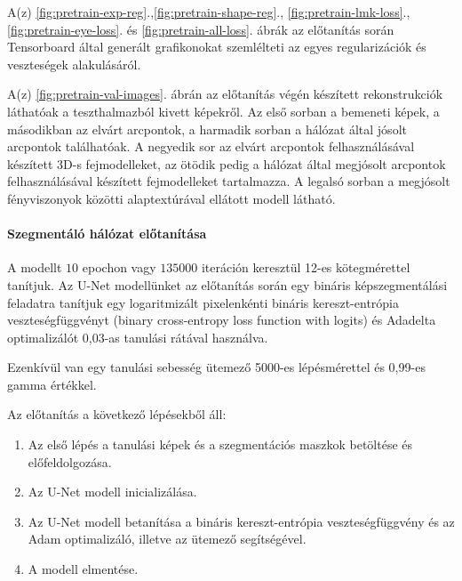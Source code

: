 \documentclass[12pt,a4]{article}
\begin{document}
        \clearpage
        A(z) \ref{fig:pretrain-exp-reg}.,\ref{fig:pretrain-shape-reg}., \ref{fig:pretrain-lmk-loss}., \ref{fig:pretrain-eye-loss}. és \ref{fig:pretrain-all-loss}. ábrák az előtanítás során Tensorboard által generált grafikonokat szemlélteti az egyes regularizációk és veszteségek alakulásáról.
        
        A(z) \ref{fig:pretrain-val-images}. ábrán az előtanítás végén készített rekonstrukciók láthatóak a teszthalmazból kivett képekről. Az első sorban a bemeneti képek, a másodikban az elvárt arcpontok, a harmadik sorban a hálózat által jósolt arcpontok találhatóak. A negyedik sor az elvárt arcpontok felhasználásával készített 3D-s fejmodelleket, az ötödik pedig a hálózat által megjósolt arcpontok felhasználásával készített fejmodelleket tartalmazza. A legalsó sorban a megjósolt fényviszonyok közötti alaptextúrával ellátott modell látható.
        
        \paragraph{Szegmentáló hálózat előtanítása}
        
        A modellt $10$ epochon vagy $135000$ iteráción keresztül 12-es kötegmérettel tanítjuk. Az U-Net modellünket az előtanítás során egy bináris képszegmentálási feladatra tanítjuk egy logaritmizált pixelenkénti bináris kereszt-entrópia veszteségfüggvényt (binary cross-entropy loss function with logits) és  Adadelta optimalizálót 0,03-as tanulási rátával használva.
        
        Ezenkívül van egy tanulási sebesség ütemező 5000-es lépésmérettel és 0,99-es gamma értékkel.

        Az előtanítás a következő lépésekből áll:
            \begin{enumerate}
                \item Az első lépés a tanulási képek és a szegmentációs maszkok betöltése és előfeldolgozása.

                \item Az U-Net modell inicializálása.

                \item Az U-Net modell betanítása a bináris kereszt-entrópia veszteségfüggvény és az Adam optimalizáló, illetve az ütemező segítségével.

                \item A modell elmentése.
            \end{enumerate}
\end{document}
